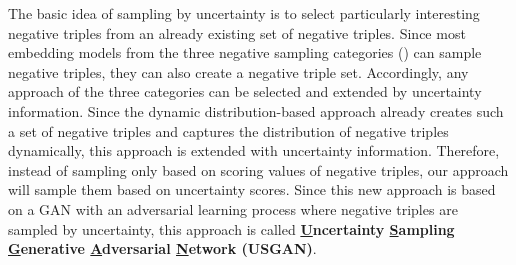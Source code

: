 The basic idea of sampling by uncertainty is to select particularly interesting negative triples from an already existing set of negative triples.
Since most embedding models from the three negative sampling categories () can sample negative triples, they can also create a negative triple set.
Accordingly, any approach of the three categories can be selected and extended by uncertainty information.
Since the dynamic distribution-based approach \kbgan already creates such a set of negative triples and captures the distribution of negative triples dynamically, this approach is extended with uncertainty information.
Therefore, instead of sampling only based on scoring values of negative triples, our approach will sample them based on uncertainty scores.
Since this new approach is based on a \ac{GAN} with an adversarial learning process where negative triples are sampled by uncertainty, this approach is called \textbf{\underline{U}ncertainty \underline{S}ampling \underline{G}enerative \underline{A}dversarial \underline{N}etwork (\textsc{USGAN})}.

